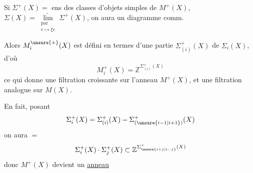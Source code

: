 Si $\Sigma^+(X)=$ ens des classes d'objets simples de $M^+(X)$, $\Sigma(X)=\underset{\substack{\text{par}\\e\mapsto\xi e}}{\underrightarrow{\lim}}\Sigma^+(X)$, on aura   un diagramme comm.

Alors $M_i^{\unsure{+}}(X)$ est défini en termes d'une partie $\Sigma^+_{(i)}(X)$ de $\Sigma_i(X)$, d'où
\[
M^+_i(X)=\mathbb Z^{\Sigma^+_{(i)}(X)}
\]
ce qui donne une filtration croissante sur l'anneau $M^+(X)$, et une filtration analogue sur $M(X)$.

En fait, posant
\[
\Sigma_i^+(X)=\Sigma^+_{(i)}(X)-\Sigma^+_{(\unsure{i-1|i+1})}(X)
\]
on aura $=$
\[
\Sigma_i^+(X)\cdot\Sigma_j^+(X)\subset\mathbb Z^{\Sigma^+_{\unsure{i+j|i-j}}(X)}
\]
donc $M^+(X)$ devient un \uline{anneau}
